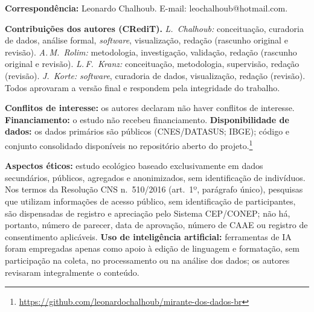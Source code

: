 \documentclass[12pt,a4paper,oneside]{article}
\begin{document}
\begin{singlespace}
\vspace{0.5cm}
\noindent\textbf{Correspondência:} Leonardo Chalhoub.
E-mail: leochalhoub@hotmail.com.

\vspace{0.4cm}
\noindent\textbf{Contribuições dos autores (CRediT).}
\textit{L.\ Chalhoub:} conceituação, curadoria de dados, análise
formal, \textit{software}, visualização, redação (rascunho original e
revisão). \textit{A.\,M.\ Rolim:} metodologia, investigação,
validação, redação (rascunho original e revisão).
\textit{L.\,F.\ Kranz:} conceituação, metodologia, supervisão, redação
(revisão). \textit{J.\ Korte:} \textit{software}, curadoria de dados,
visualização, redação (revisão). Todos aprovaram a versão final e
respondem pela integridade do trabalho.

\vspace{0.4cm}
\noindent\textbf{Conflitos de interesse:} os autores declaram não
haver conflitos de interesse. \textbf{Financiamento:} o estudo não
recebeu financiamento. \textbf{Disponibilidade de dados:} os dados
primários são públicos (CNES/DATASUS; IBGE); código e conjunto
consolidado disponíveis no repositório aberto do projeto.\footnote{%
\url{https://github.com/leonardochalhoub/mirante-dos-dados-br}}

\vspace{0.4cm}
\noindent\textbf{Aspectos éticos:} estudo ecológico baseado
exclusivamente em dados secundários, públicos, agregados e
anonimizados, sem identificação de indivíduos. Nos termos da Resolução
CNS n.\ 510/2016 (art.\ 1º, parágrafo único), pesquisas que utilizam
informações de acesso público, sem identificação de participantes, são
dispensadas de registro e apreciação pelo Sistema CEP/CONEP; não há,
portanto, número de parecer, data de aprovação, número de CAAE ou
registro de consentimento aplicáveis. \textbf{Uso de inteligência
artificial:} ferramentas de IA foram empregadas apenas como apoio à
edição de linguagem e formatação, sem participação na coleta, no
processamento ou na análise dos dados; os autores revisaram
integralmente o conteúdo.

\end{singlespace}

\newpage

\end{document}
